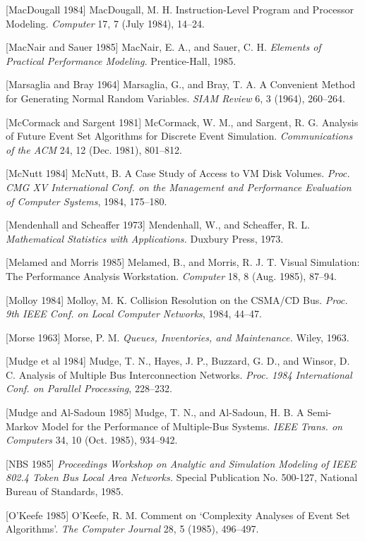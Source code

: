[MacDougall 1984] MacDougall, M. H. Instruction-Level Program and Processor Modeling. \textit{Computer} 17, 7 (July 1984), 14--24.

[MacNair and Sauer 1985] MacNair, E. A., and Sauer, C. H. \textit{Elements of Practical Performance Modeling.} Prentice-Hall, 1985.

[Marsaglia and Bray 1964] Marsaglia, G., and Bray, T. A. A Convenient Method for Generating Normal Random Variables. \textit{SIAM Review} 6, 3 (1964), 260--264.

[McCormack and Sargent 1981] McCormack, W. M., and Sargent, R. G. Analysis of Future Event Set Algorithms for Discrete Event Simulation. \textit{Communications of the ACM} 24, 12 (Dec. 1981), 801--812.

[McNutt 1984] McNutt, B. A Case Study of Access to VM Disk Volumes. \textit{Proc. CMG XV International Conf. on the Management and Performance Evaluation of Computer Systems}, 1984, 175--180.

[Mendenhall and Scheaffer 1973] Mendenhall, W., and Scheaffer, R. L. \textit{Mathematical Statistics with Applications.} Duxbury Press, 1973.

[Melamed and Morris 1985] Melamed, B., and Morris, R. J. T. Visual Simulation: The Performance Analysis Workstation. \textit{Computer} 18, 8 (Aug. 1985), 87--94.

[Molloy 1984] Molloy, M. K. Collision Resolution on the CSMA/CD Bus. \textit{Proc. 9th IEEE Conf. on Local Computer Networks}, 1984, 44--47.

[Morse 1963] Morse, P. M. \textit{Queues, Inventories, and Maintenance.} Wiley, 1963.

[Mudge et al 1984] Mudge, T. N., Hayes, J. P., Buzzard, G. D., and Winsor, D. C. Analysis of Multiple Bus Interconnection Networks. \textit{Proc. 1984 International Conf. on Parallel Processing}, 228--232.

[Mudge and Al-Sadoun 1985] Mudge, T. N., and Al-Sadoun, H. B. A Semi-Markov Model for the Performance of Multiple-Bus Systems. \textit{IEEE Trans. on Computers} 34, 10 (Oct. 1985), 934--942.

[NBS 1985] \textit{Proceedings Workshop on Analytic and Simulation Modeling of IEEE 802.4 Token Bus Local Area Networks.} Special Publication No. 500-127, National Bureau of Standards, 1985.

[O'Keefe 1985] O'Keefe, R. M. Comment on `Complexity Analyses of Event Set Algorithms'. \textit{The Computer Journal} 28, 5 (1985), 496--497.

